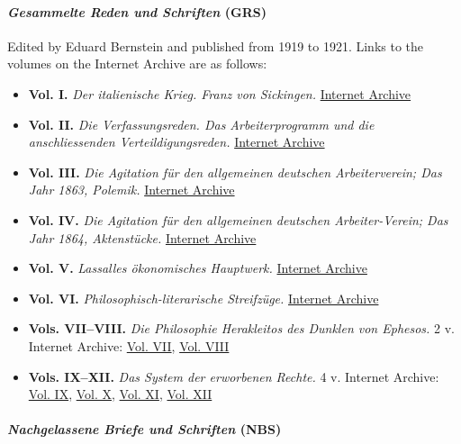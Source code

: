 \paragraph{\textit{Gesammelte Reden und Schriften} (GRS)}

Edited by Eduard Bernstein and published from 1919 to 1921. Links to the volumes on the Internet Archive are as follows:
\begin{itemize}
    \item \textbf{Vol. I.} \textit{Der italienische Krieg. Franz von Sickingen.} \href{https://archive.org/details/gesammelteredenu01lassuoft/}{Internet Archive}
    \item \textbf{Vol. II.} \textit{Die Verfassungsreden. Das Arbeiterprogramm und die anschliessenden Verteildigungsreden.} \href{https://archive.org/details/gesammelteredenu02lassuoft/}{Internet Archive}
    \item \textbf{Vol. III.} \textit{Die Agitation für den allgemeinen deutschen Arbeiterverein; Das Jahr 1863, Polemik.} \href{https://archive.org/details/gesammelteredenu03lassuoft/}{Internet Archive}
    \item \textbf{Vol. IV.} \textit{Die Agitation für den allgemeinen deutschen Arbeiter-Verein; Das Jahr 1864, Aktenstücke.} \href{https://archive.org/details/gesammelteredenu04lassuoft/}{Internet Archive}
    \item \textbf{Vol. V.} \textit{Lassalles ökonomisches Hauptwerk.} \href{https://archive.org/details/gesammelteredenu05lassuoft/}{Internet Archive}
    \item \textbf{Vol. VI.} \textit{Philosophisch-literarische Streifzüge.} \href{https://archive.org/details/gesammelteredenu06lassuoft/}{Internet Archive}
    \item \textbf{Vols. VII--VIII.} \textit{Die Philosophie Herakleitos des Dunklen von Ephesos.} 2 v. Internet Archive: \href{https://archive.org/details/gesammelteredenu07lassuoft/}{Vol. VII}, \href{https://archive.org/details/gesammelteredenu08lassuoft/}{Vol. VIII}
    \item \textbf{Vols. IX--XII.} \textit{Das System der erworbenen Rechte.} 4 v. Internet Archive: \href{https://archive.org/details/gesammelteredenu09lassuoft/}{Vol. IX}, \href{https://archive.org/details/gesammelteredenu10lassuoft/}{Vol. X}, \href{https://archive.org/details/gesammelteredenu11lassuoft/}{Vol. XI}, \href{https://archive.org/details/gesammelteredenu12lassuoft/}{Vol. XII}
\end{itemize}

\paragraph{\textit{Nachgelassene Briefe und Schriften} (NBS)}

